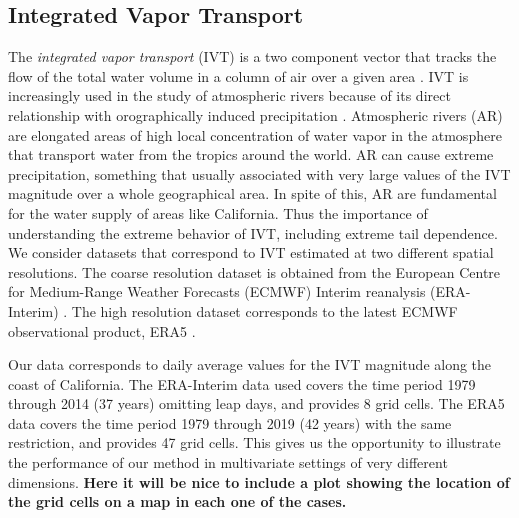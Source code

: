 \subsection{Integrated Vapor Transport\label{subsec:ivt}}
The \emph{integrated vapor transport} (IVT) is a two component vector 
that tracks the flow of the total water volume in a column of air 
over a given area \citep{ralph2017}.  IVT is increasingly used in the study of atmospheric rivers because of its direct 
relationship with orographically induced precipitation
\citep{neiman2009water}. Atmospheric rivers (AR) are elongated areas of high 
local concentration of water vapor in the atmosphere that transport water
from the tropics around the world. AR can cause extreme 
precipitation,  something that usually associated with very large values
of the IVT magnitude over a whole geographical area. In spite of this, AR
are fundamental for the water supply of areas like California. Thus the
importance of understanding the extreme behavior of IVT, including 
extreme tail dependence. We consider datasets that correspond to IVT
estimated at two different spatial resolutions. The coarse resolution dataset
is obtained from the European Centre for Medium-Range Weather Forecasts
(ECMWF) Interim reanalysis (ERA-Interim) \citep{berrisford2011atmospheric,dee2011era}. 
The high resolution dataset corresponds to the latest ECMWF 
observational product, ERA5  \citep{hersbach2020era5}. 

Our data corresponds to daily average values for the IVT magnitude
along the coast of California.  The ERA-Interim data used covers the time period 
1979 through 2014 (37 years) omitting leap days, and provides 8 grid cells.  The ERA5 data
covers the time period 1979 through 2019 (42 years) with the same restriction, and provides 
47 grid cells.  This gives us the opportunity to illustrate the performance of our method 
in multivariate settings of very different dimensions. {\bf Here it will be nice to include a plot showing the location of the grid cells on a map in each one of the cases.}








